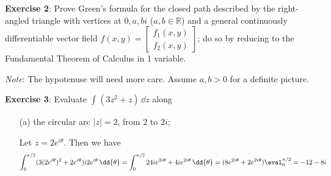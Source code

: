 \documentclass{article}
\begin{document}
\newpage

\textbf{Exercise 2}: Prove Green's formula for the closed path described by the right-angled triangle with vertices at $0, a, bi$ ($a, b \in \mathbb{R}$) and a general continuously differentiable vector field $f(x, y) = \begin{bmatrix}
    f_{1}(x, y) \\
    f_{2}(x, y)   
\end{bmatrix}$; do so by reducing to the Fundamental Theorem of Calculus in 1 variable.

\textit{Note}: The hypotenuse will need more care. Assume $a, b > 0$ for a definite picture.

\newpage

\textbf{Exercise 3}: Evaluate $\int_{}^{} (3z^{2} + z) \, \dd{z} $ along
    \begin{itemize}
        \item [(a)] the circular arc $\lvert z \rvert = 2$, from $2$ to $2i$;
            \begin{answer}
                Let $z= 2e^{i\theta}$. Then we have
                    \begin{equation*}
                        \int_{0}^{\pi/2} (3(2e^{i\theta})^{2} + 2e^{i\theta})i2e^{i\theta} \, \dd{\theta} = \int_{0}^{\pi/2} 24ie^{3i\theta} + 4ie^{2i\theta}  \, \dd{\theta}  = (8e^{2i\theta} + 2e^{2i\theta}) \eval_{0}^{\pi/2} = -12 - 8i
                    \end{equation*}
            \end{answer}


\end{itemize}
\end{document}
